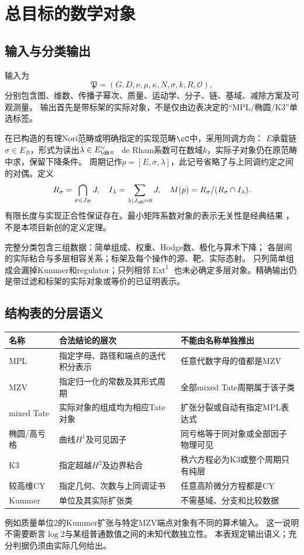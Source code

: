 \documentclass[11pt,a4paper]{ctexart}
\theoremstyle{cnplain}\newtheorem{theorem}{定理}[section]
\theoremstyle{definition}\newtheorem{definition}[theorem]{定义}
\theoremstyle{remark}\newtheorem{remark}[theorem]{注}
\begin{document}
\section{总目标的数学对象}
\subsection{输入与分类输出}
输入为
\[
 \mathfrak P=(G,D,\nu,\mu,\kappa,N,\sigma,k,R,\mathcal O),
\]
分别包含图、维数、传播子幂次、质量、运动学、分子、链、基域、减除方案及可观测量。
输出首先是带标架的实际对象，不是仅由边表决定的“MPL/椭圆/K3”单选标签。

在已构造的有理Nori范畴或明确指定的实现范畴$\cC$中，采用同调方向：
$E$承载链$\sigma\in E_B$，形式为读出$\lambda\in E_{\dR}^{\vee}$。
de Rham系数可在数域$k$，实际子对象仍在原范畴中求，保留下降条件。
周期记作$p=[E,\sigma,\lambda]$，此记号省略了与上同调约定之间的对偶。定义
\[
 R_\sigma=\bigcap_{\sigma\in J_B}J,\quad
 I_\lambda=\sum_{\lambda|J_{\dR}=0}J,\quad
 M(p)=R_\sigma/(R_\sigma\cap I_\lambda).
\]
有限长度与实现正合性保证存在。最小矩阵系数对象的表示无关性是经典结果
\cite[\S2.4]{brown}，不是本项目新创的定义定理。

完整分类包含三组数据：简单组成、权重、Hodge数、极化与算术下降；
各层间的实际粘合与多层相容关系；标架及每个操作的源、靶、实际态射。
只列简单组成会漏掉Kummer和regulator；只列相邻$\operatorname{Ext}^1$
也未必确定多层对象。精确输出仍是带过滤和标架的实际对象或等价的已证明表示。

\subsection{结构表的分层语义}
\begin{center}\small
\begin{tabular}{p{24mm}p{47mm}p{72mm}}
\toprule 名称&合法结论的层次&不能由名称单独推出\\\midrule
MPL&指定字母、路径和端点的迭代积分表示&任意代数字母的值都是MZV\\
MZV&指定归一化的常数及其形式周期&全部mixed Tate周期属于该子类\\
mixed Tate&实际对象的组成均为相应Tate对象&扩张分裂或自动有指定MPL表达式\\
椭圆/高亏格&曲线$H^1$及可见因子&同亏格等于同对象或全部因子物理可见\\
K3&指定超越$H^2$及边界粘合&秩六方程必为K3或整个周期只有纯层\\
较高维CY&指定几何、次数与上同调证书&任意高阶微分方程都是CY\\
Kummer&单位及其实际扩张类&不需基域、分支和比较数据\\\bottomrule
\end{tabular}
\end{center}
例如质量单位$2$的Kummer扩张与特定MZV端点对象有不同的算术输入。
这一说明不需要断言$\log2$与某组普通数值之间的未知代数独立性。
本表规定输出语义；充分判据仍须由实际几何给出。
\end{document}
